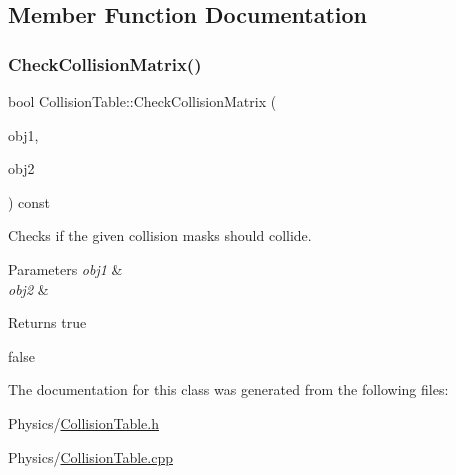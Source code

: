 \subsection{Member Function Documentation}
\mbox{\label{classCollisionTable_a21c09fb6803e3da3deb9ea9b12648f27}} 
\subsubsection{\texorpdfstring{Check\+Collision\+Matrix()}{CheckCollisionMatrix()}}
{\footnotesize\ttfamily bool Collision\+Table\+::\+Check\+Collision\+Matrix (\begin{DoxyParamCaption}\item[{Collision\+Mask}]{obj1,  }\item[{Collision\+Mask}]{obj2 }\end{DoxyParamCaption}) const}



Checks if the given collision masks should collide. 


\begin{DoxyParams}{Parameters}
{\em obj1} & \\
\hline
{\em obj2} & \\
\hline
\end{DoxyParams}
\begin{DoxyReturn}{Returns}
true 

false 
\end{DoxyReturn}


The documentation for this class was generated from the following files\+:\begin{DoxyCompactItemize}
\item 
Physics/\hyperlink{CollisionTable_8h}{Collision\+Table.\+h}\item 
Physics/\hyperlink{CollisionTable_8cpp}{Collision\+Table.\+cpp}\end{DoxyCompactItemize}
